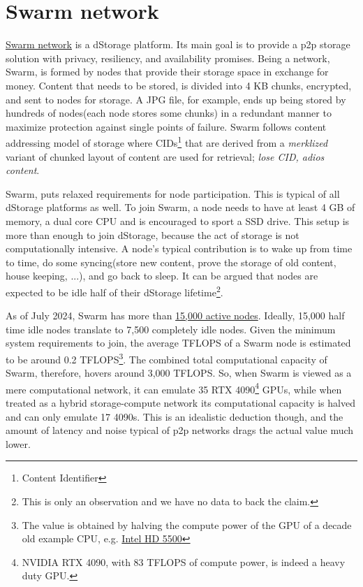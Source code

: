\documentclass[a4paper, 10pt]{article}
\begin{document}
\section{Swarm network}
\href{https://www.ethswarm.org/}{Swarm network} is a dStorage platform. Its main goal is to provide a p2p storage solution with privacy, resiliency, and availability promises\cite{swarm:2021}. Being a network, Swarm, is formed by nodes that provide their storage space in exchange for money. Content that needs to be stored, is divided into 4 KB chunks, encrypted, and sent to nodes for storage. A JPG file, for example, ends up being stored by hundreds of nodes(each node stores some chunks) in a redundant manner to maximize protection against single points of failure. Swarm follows content addressing model of storage where CIDs\footnote{Content Identifier} that are derived from a \textit{merklized} variant of chunked layout of content are used for retrieval; \textit{lose CID, adios content}.
\par
Swarm, puts relaxed requirements for node participation. This is typical of all dStorage platforms as well. To join Swarm, a node needs to have at least 4 GB of memory, a dual core CPU and is encouraged to sport a SSD drive. This setup is more than enough to join dStorage, because the act of storage is not computationally intensive. A node's typical contribution is to wake up from time to time, do some syncing(store new content, prove the storage of old content, house keeping, ...), and go back to sleep. It can be argued that nodes are expected to be idle half of their dStorage lifetime\footnote{This is only an observation and we have no data to back the claim.}. 
\par
As of July 2024, Swarm has more than \href{https://swarmscan.io/stats/availability}{15,000 active nodes}. Ideally, 15,000 half time idle nodes translate to 7,500 completely idle nodes. Given the minimum system requirements to join, the average TFLOPS of a Swarm node is estimated to be around 0.2 TFLOPS\footnote{The value is obtained by halving the compute power of the GPU of a decade old example CPU, e.g. \href{https://www.techpowerup.com/gpu-specs/hd-graphics-5500-mobile.c2625}{Intel HD 5500}}. The combined total computational capacity of Swarm, therefore, hovers around 3,000 TFLOPS. So, when Swarm is viewed as a mere computational network, it can emulate 35 RTX 4090\footnote{NVIDIA RTX 4090, with 83 TFLOPS of compute power, is indeed a heavy duty GPU.} GPUs, while when treated as a hybrid storage-compute network its computational capacity is halved and can only emulate 17 4090s. This is an idealistic deduction though, and the amount of latency and noise typical of p2p networks drags the actual value much lower. 
\end{document}
